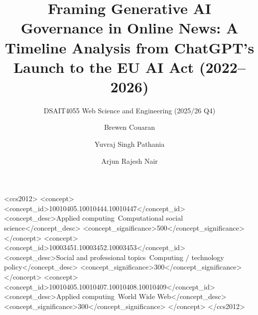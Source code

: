 \documentclass[sigconf]{acmart}
\begin{document}
\title{Framing Generative AI Governance in Online News: A Timeline Analysis from ChatGPT's Launch to the EU AI Act (2022--2026)}
\subtitle{DSAIT4055 Web Science and Engineering (2025/26 Q4)}

\author{Brewen Couaran}

\author{Yuvraj Singh Pathania}

\author{Arjun Rajesh Nair}

\renewcommand{\shortauthors}{Couaran et al.}

\received{\today}

\begin{CCSXML}
<ccs2012>
    <concept>
        <concept_id>10010405.10010444.10010447</concept_id>
        <concept_desc>Applied computing~Computational social science</concept_desc>
        <concept_significance>500</concept_significance>
    </concept>
    <concept>
        <concept_id>10003451.10003452.10003453</concept_id>
        <concept_desc>Social and professional topics~Computing / technology policy</concept_desc>
        <concept_significance>300</concept_significance>
    </concept>
    <concept>
        <concept_id>10010405.10010407.10010408.10010409</concept_id>
        <concept_desc>Applied computing~World Wide Web</concept_desc>
        <concept_significance>300</concept_significance>
    </concept>
</ccs2012>
\end{CCSXML}
\end{document}

